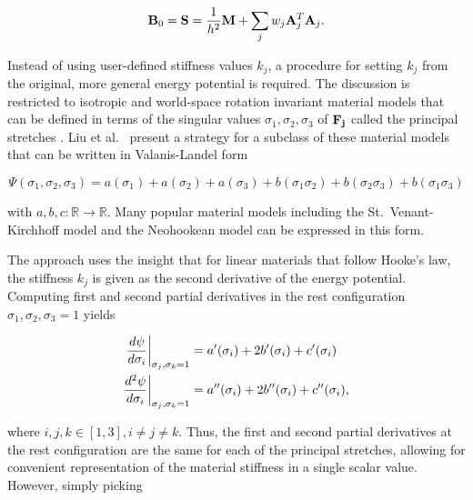 \begin{equation}\label{eq:global-matrix-strain}
    \mathbf{B}_0 = \mathbf{S} = \frac{1}{h^2}\mathbf{M} + \sum_j w_j \mathbf{A}_j^T \mathbf{A}_j.
\end{equation}

Instead of using user-defined stiffness values $k_j$, a procedure for setting $k_j$ from the original, more general energy
potential is required. The discussion is restricted to isotropic and world-space rotation invariant material models that 
can be defined in terms of the singular 
values $\sigma_1, \sigma_2, \sigma_3$ of $\mathbf{F_j}$ called the principal stretches \cite{sifakis2012}. Liu et al.\ 
\cite{liu2017} present a strategy for a subclass of these material models that can be written in Valanis-Landel form

\begin{equation}\label{eq:valanis-landel}
    \Psi(\sigma_1, \sigma_2, \sigma_3) = a(\sigma_1) + a(\sigma_2) + a(\sigma_3) + b(\sigma_1 \sigma_2) 
    + b(\sigma_2 \sigma_3) + b(\sigma_1 \sigma_3)
\end{equation}

\noindent with $a, b, c : \mathbb{R} \to \mathbb{R}$. Many popular material models including the St.\ Venant-Kirchhoff model and 
the Neohookean model can be expressed in this form.

The approach uses the insight that for linear materials that follow Hooke's law, the stiffness $k_j$ is given as the second 
derivative of the energy potential. Computing first and second partial derivatives in the rest configuration $\sigma_1, 
\sigma_2, \sigma_3 = 1$ yields

\begin{align}
    \evalat[\bigg]{\frac{d \psi}{d \sigma_i}}{\sigma_j, \sigma_k = 1} 
    &= a^{\prime}(\sigma_i) + 2b^{\prime}(\sigma_i) + c^{\prime}(\sigma_i) \label{eq:valandis-landel-first} \\
    \evalat[\bigg]{\frac{d^2 \psi}{d \sigma_i}}{\sigma_j, \sigma_k = 1} 
    &= a^{\prime\prime}(\sigma_i) + 2b^{\prime\prime}(\sigma_i) + c^{\prime\prime}(\sigma_i) \label{eq:valandis-landel-second},
\end{align}

\noindent where $i, j, k \in [1, 3], i \neq j \neq k$. Thus, the first and second partial derivatives at the rest configuration are the same
for each of the principal stretches, allowing for convenient representation of the material stiffness in a single scalar value. However,
simply picking


